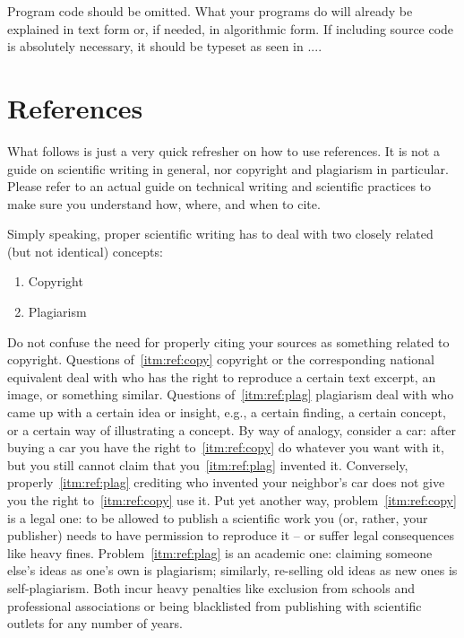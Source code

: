 \documentclass[]{ccs-thesis}
\begin{document}
{Program code should be omitted.
What your programs do will already be explained in text form or, if needed, in algorithmic form.
If including source code is absolutely necessary, it should be typeset as seen in ....

\clearpage
\section{References}

What follows is just a very quick refresher on how to use references.
It is not a guide on scientific writing in general, nor copyright and plagiarism in particular.
Please refer to an actual guide on technical writing and scientific practices to make sure you understand how, where, and when to cite.

Simply speaking, proper scientific writing has to deal with two closely related (but not identical) concepts:
\begin{enumerate}[label=\alph*),ref=(\alph*)]
\item\label{itm:ref:copy}
Copyright
\item
Plagiarism\label{itm:ref:plag}
\end{enumerate}
Do not confuse the need for properly citing your sources as something related to copyright.
Questions of~\ref{itm:ref:copy} copyright or the corresponding national equivalent deal with who has the right to reproduce a certain text excerpt, an image, or something similar.
Questions of~\ref{itm:ref:plag} plagiarism deal with who came up with a certain idea or insight, e.g., a certain finding, a certain concept, or a certain way of illustrating a concept.
By way of analogy, consider a car: after buying a car you have the right to~\ref{itm:ref:copy} do whatever you want with it, but you still cannot claim that you~\ref{itm:ref:plag} invented it.
Conversely, properly~\ref{itm:ref:plag} crediting who invented your neighbor's car does not give you the right to~\ref{itm:ref:copy} use it.
Put yet another way, problem~\ref{itm:ref:copy} is a legal one: to be allowed to publish a scientific work you (or, rather, your publisher) needs to have permission to reproduce it -- or suffer legal consequences like heavy fines.
Problem~\ref{itm:ref:plag} is an academic one: claiming someone else's ideas as one's own is plagiarism; similarly, re-selling old ideas as new ones is self-plagiarism.
Both incur heavy penalties like exclusion from schools and professional associations or being blacklisted from publishing with scientific outlets for any number of years.

}
\end{document}
